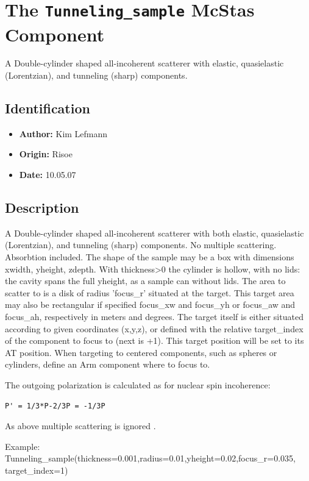 \section{The \texttt{Tunneling\_sample} McStas Component}
A Double-cylinder shaped all-incoherent scatterer
with elastic, quasielastic (Lorentzian), and tunneling (sharp)
components.

\subsection*{Identification}
\begin{itemize}
  \item \textbf{Author:} Kim Lefmann
  \item \textbf{Origin:} Risoe
  \item \textbf{Date:} 10.05.07
\end{itemize}

\subsection*{Description}
A Double-cylinder shaped all-incoherent scatterer with both elastic, quasielastic (Lorentzian), and tunneling (sharp) components. No multiple scattering. Absorbtion included. The shape of the sample may be a box with dimensions xwidth, yheight, zdepth. With thickness\textgreater{}0 the cylinder is hollow, with no lids: the cavity spans the full yheight, as a sample can without lids. The area to scatter to is a disk of radius 'focus\_r' situated at the target. This target area may also be rectangular if specified focus\_xw and focus\_yh or focus\_aw and focus\_ah, respectively in meters and degrees. The target itself is either situated according to given coordinates (x,y,z), or defined with the relative target\_index of the component to focus to (next is +1). This target position will be set to its AT position. When targeting to centered components, such as spheres or cylinders, define an Arm component where to focus to.

The outgoing polarization is calculated as for nuclear spin incoherence:

\begin{verbatim}
P' = 1/3*P-2/3P = -1/3P
\end{verbatim}

As above multiple scattering is ignored .

Example: Tunneling\_sample(thickness=0.001,radius=0.01,yheight=0.02,focus\_r=0.035, target\_index=1)


